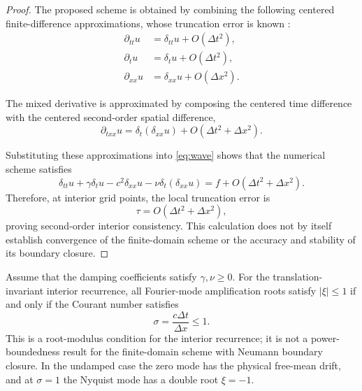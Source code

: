 \documentclass{Configuration_Files/PoliMi3i_thesis}
\begin{document}
\begin{proof}
The proposed scheme is obtained by combining the following centered finite-difference approximations, whose truncation error is known \citep[see, e.g.,][]{bilbao_numerical_2009,bergman_computational_2018}:
\begin{align*}
\partial_{tt}u
&=
\delta_{tt}u
+
O(\Delta t^2),\\
\partial_tu
&=
\delta_tu
+
O(\Delta t^2),\\
\partial_{xx}u
&=
\delta_{xx}u
+
O(\Delta x^2).
\end{align*}

The mixed derivative is approximated by composing the centered time difference
with the centered second-order spatial difference,
\begin{equation*}
\partial_{txx}u
=
\delta_t(\delta_{xx}u)
+
O(\Delta t^2+\Delta x^2).
\end{equation*}

Substituting these approximations into \eqref{eq:wave}
shows that the numerical scheme satisfies
\begin{equation*}
\delta_{tt}u
+\gamma\delta_tu
-c^2\delta_{xx}u
-\nu\delta_t(\delta_{xx}u)
=
f
+
O(\Delta t^2+\Delta x^2).
\end{equation*}
Therefore, at interior grid points, the local truncation error is
\begin{equation*}
\tau
=
O(\Delta t^2+\Delta x^2),
\end{equation*}
proving second-order interior consistency. This calculation does not by itself establish convergence of the finite-domain scheme or the accuracy and stability of its boundary closure.
\end{proof}

\begin{proposition}
Assume that the damping coefficients satisfy $\gamma,\nu\ge0$. For the
translation-invariant interior recurrence, all Fourier-mode amplification
roots satisfy $|\xi|\le1$ if and only if the Courant number satisfies
\begin{equation*}
    \sigma=\frac{c\Delta t}{\Delta x}\le1.
\end{equation*}
This is a root-modulus condition for the interior recurrence; it is not a
power-boundedness result for the finite-domain scheme with Neumann boundary
closure. In the undamped case the zero mode has the physical free-mean drift,
and at $\sigma=1$ the Nyquist mode has a double root $\xi=-1$.
\end{proposition}
\end{document}

